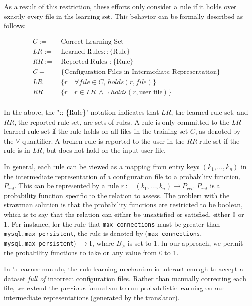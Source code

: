 As a result of this restriction, 
these efforts only consider a rule if it holds over exactly every file in 
the learning set. This behavior can be formally described as follows:
\begin{small}
\begin{align*}
C :=&\ \text{Correct Learning Set}\\
LR :=&\ \text{Learned Rules} :: \{\textrm{Rule}\}\\
RR :=&\ \text{Reported Rules} :: \{\textrm{Rule}\}\\ 
C =&\ \text{\{Configuration Files in Intermediate Representation\}}\\
LR =&\ \{ r\ \mid \forall file \in C,\ holds(r,file)\} \\
RR =&\ \{ r\ \mid r \in LR \ \land \neg\ holds(r,\textrm{user file}) \}\\
\end{align*}
\end{small}
In the above, the ":: \{Rule\}" notation indicates that $LR$, the learned rule set, 
and $RR$, the reported rule set, are sets of rules.
A rule is only committed to the $LR$ learned rule set if 
the rule holds on all files in the training set $C$, as denoted by the $\forall$ quantifier. 
A broken rule is reported to the user in the $RR$ rule set if the rule is in $LR$, 
but does not hold on the input user file.

In general, each rule can be viewed as a mapping from 
entry keys $(k_1, \ldots, k_n)$ in the intermediate representation of a 
configuration file to a probability function, $P_{rel}$. This can be represented by a rule
$r := (k_1, \ldots, k_n) \rightarrow P_{rel}$.
$P_{rel}$ is a probability function specific to the relation to assess.
The problem with the strawman solution is that the probability functions are restricted to be 
boolean, which is to say that the relation can either be unsatisfied or satisfied, either 0 or 1. 
For instance, for the rule that {\tt max\_connections} must 
be greater than {\tt mysql.max\_persistent}, the rule is denoted by
({\tt max\_connections}, {\tt mysql.max\_persistent}) $\to 1$, where 
$B_{>}$ is set to 1. In our approach, we permit the probability functions to take on any value from 0 to 1.

In \app's learner module, the rule learning mechanism is tolerant 
enough to accept a dataset {\em full of} incorrect configuration files. 
Rather than manually correcting each file, 
we extend the previous formalism to run probabilistic learning
on our intermediate representations (generated by the translator). 

